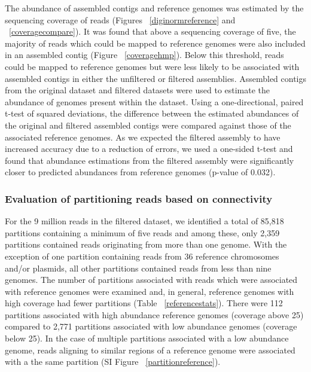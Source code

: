 \documentclass[11pt]{article} %
\begin{document}
The abundance of assembled contigs and reference genomes was estimated by the sequencing coverage of reads (Figures ~\ref{diginormreference} and ~\ref{coveragecompare}).   It was found that above a sequencing coverage of five, the majority of reads which could be mapped to reference genomes were also included in an assembled contig (Figure ~\ref{coveragehmp}).  Below this threshold, reads could be mapped to reference genomes but were less likely to be associated with assembled contigs in either the unfiltered or filtered assemblies.   Assembled contigs from the original dataset and filtered datasets were used to estimate the abundance of 
genomes present within the dataset.  Using a one-directional, paired t-test of squared deviations, the difference between the estimated abundances of the original and filtered assembled contigs were compared against those of the associated reference genomes.  As we expected the filtered assembly to have increased accuracy due to a reduction of errors, we used a one-sided t-test and found that abundance estimations from the filtered assembly were significantly closer to predicted abundances from reference genomes (p-value of 0.032).  

\subsubsection{Evaluation of partitioning reads based on connectivity}
For the 9 million reads in the filtered dataset, we identified a total of 85,818 partitions containing a minimum of five reads and among these, only 2,359 partitions contained reads originating from more than one genome.  With the exception of one partition containing reads from 36 reference chromosomes and/or plasmids, all other partitions contained reads from less than nine genomes.  The number of partitions associated with reads which were associated with reference genomes were examined and, in general, reference genomes with high coverage had fewer partitions (Table ~\ref{referencestats}).  There were 112 partitions associated with high abundance reference genomes (coverage above 25) compared to 2,771 partitions associated with low abundance genomes (coverage below 25).  In the case of multiple partitions associated with a low abundance genome, reads aligning to similar regions of a reference genome were associated with a the same partition (SI Figure ~\ref{partitionreference}).
\end{document}
